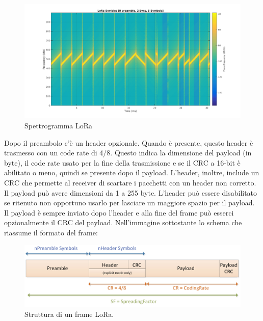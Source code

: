\documentclass[12pt,a4paper,openright,twoside]{report}
\begin{document}
\begin{figure}[h]                      
\begin{center} 
\includegraphics[width=\textwidth]{LoRa_Symbols_01.png}
\caption[Spettrogramma LoRa]{ Spettrogramma LoRa}\label{fig:prima}
\end{center}
\end{figure}

Dopo il preambolo c'\`e un header opzionale. Quando \`e presente, questo header \`e trasmesso con un code rate di 4/8. Questo indica la dimensione del payload (in byte), il code rate usato per la fine della trasmissione e se il CRC a 16-bit \`e abilitato o meno, quindi se presente dopo il payload. L'header, inoltre, include un CRC che permette al receiver di scartare i pacchetti con un header non corretto. Il payload pu\`o avere dimensioni da 1 a 255 byte. L'header pu\`o essere disabilitato se ritenuto non opportuno usarlo per lasciare un maggiore spazio per il payload. Il payload \`e sempre inviato dopo l'header e alla fine del frame pu\`o esserci opzionalmente il CRC del payload. 
Nell'immagine sottostante lo schema che riassume il formato del frame:

\begin{figure}[h]                      
\begin{center} 
\includegraphics[width=\textwidth]{struttura_pacchetto_lora.png}
\caption[Struttura di un frame LoRa]{ Struttura di un frame LoRa.} \label{fig:venti}
\end{center}
\end{figure}
\end{document}
